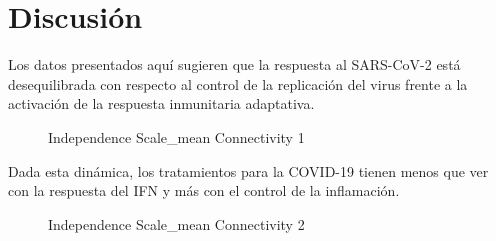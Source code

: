 \section{Discusión}
Los datos presentados aquí sugieren que la respuesta al SARS-CoV-2 está desequilibrada con respecto al control de la replicación del virus frente a la activación de la respuesta inmunitaria adaptativa.

\begin{figure}[h]
	\caption{Independence Scale_mean Connectivity 1}
	\label{fig:sample_clustering}
\end{figure}

Dada esta dinámica, los tratamientos para la COVID-19 tienen menos que ver con la respuesta del IFN y más con el control de la inflamación. 

\begin{figure}[!]
	\caption{Independence Scale_mean Connectivity 2}
	\label{fig:sample_clustering}
\end{figure}
	
